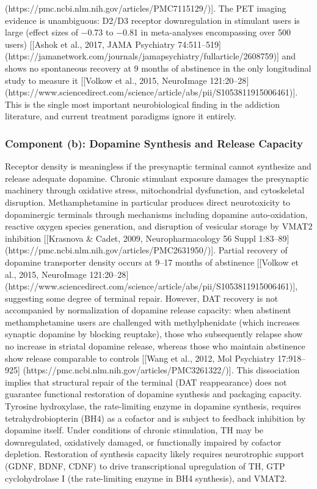 (https://pmc.ncbi.nlm.nih.gov/articles/PMC7115129/){]}. The PET imaging evidence is unambiguous: D2/D3 receptor downregulation in stimulant users is large (effect sizes of −0.73 to −0.81 in meta-analyses encompassing over 500 users) {[}{[}Ashok et al., 2017, JAMA Psychiatry 74:511--519{]} (https://jamanetwork.com/journals/jamapsychiatry/fullarticle/2608759){]} and shows no spontaneous recovery at 9 months of abstinence in the only longitudinal study to measure it {[}{[}Volkow et al., 2015, NeuroImage 121:20--28{]} (https://www.sciencedirect.com/science/article/abs/pii/S1053811915006461){]}. This is the single most important neurobiological finding in the addiction literature, and current treatment paradigms ignore it entirely.

\subsubsection{Component (b): Dopamine Synthesis and Release Capacity}\label{18_restoration-component-b-dopamine-synthesis-and-release-capacity}

Receptor density is meaningless if the presynaptic terminal cannot synthesize and release adequate dopamine. Chronic stimulant exposure damages the presynaptic machinery through oxidative stress, mitochondrial dysfunction, and cytoskeletal disruption. Methamphetamine in particular produces direct neurotoxicity to dopaminergic terminals through mechanisms including dopamine auto-oxidation, reactive oxygen species generation, and disruption of vesicular storage by VMAT2 inhibition {[}{[}Krasnova \& Cadet, 2009, Neuropharmacology 56 Suppl 1:83--89{]} (https://pmc.ncbi.nlm.nih.gov/articles/PMC2631950/){]}. Partial recovery of dopamine transporter density occurs at 9--17 months of abstinence {[}{[}Volkow et al., 2015, NeuroImage 121:20--28{]} (https://www.sciencedirect.com/science/article/abs/pii/S1053811915006461){]}, suggesting some degree of terminal repair. However, DAT recovery is not accompanied by normalization of dopamine release capacity: when abstinent methamphetamine users are challenged with methylphenidate (which increases synaptic dopamine by blocking reuptake), those who subsequently relapse show no increase in striatal dopamine release, whereas those who maintain abstinence show release comparable to controls {[}{[}Wang et al., 2012, Mol Psychiatry 17:918--925{]} (https://pmc.ncbi.nlm.nih.gov/articles/PMC3261322/){]}. This dissociation implies that structural repair of the terminal (DAT reappearance) does not guarantee functional restoration of dopamine synthesis and packaging capacity. Tyrosine hydroxylase, the rate-limiting enzyme in dopamine synthesis, requires tetrahydrobiopterin (BH4) as a cofactor and is subject to feedback inhibition by dopamine itself. Under conditions of chronic stimulation, TH may be downregulated, oxidatively damaged, or functionally impaired by cofactor depletion. Restoration of synthesis capacity likely requires neurotrophic support (GDNF, BDNF, CDNF) to drive transcriptional upregulation of TH, GTP cyclohydrolase I (the rate-limiting enzyme in BH4 synthesis), and VMAT2.

